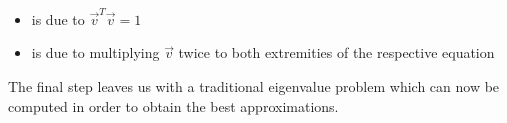 \vspace{-10mm}

\begin{itemize}
	\item {} is due to $\overrightarrow{v}^T \overrightarrow{v} = 1$
	\item {} is due to multiplying $\overrightarrow{v}$ twice to both extremities of the respective equation
\end{itemize}
	
\noindent The final step  leaves us with a traditional eigenvalue problem which can now be computed in order to obtain the best approximations.




\clearpage

